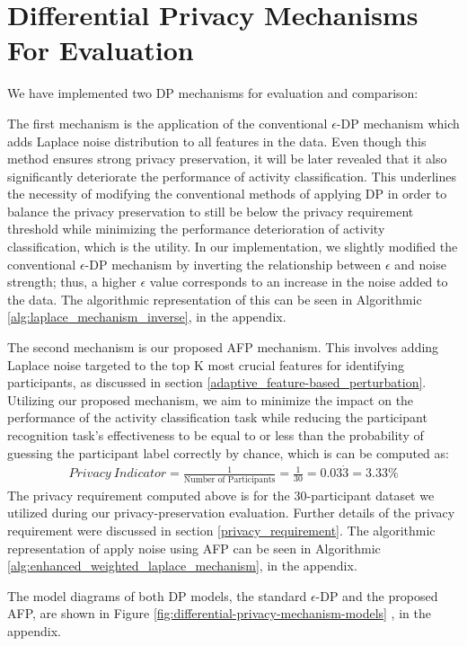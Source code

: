 \documentclass{l4proj}
\begin{document}
\section{Differential Privacy Mechanisms For Evaluation}
We have implemented two DP mechanisms for evaluation and comparison:

The first mechanism is the application of the conventional $\epsilon$-DP mechanism which adds Laplace noise distribution to all features in the data. Even though this method ensures strong privacy preservation, it will be later revealed that it also significantly deteriorate the performance of activity classification. This underlines the necessity of modifying the conventional methods of applying DP in order to balance the privacy preservation to still be below the privacy requirement threshold while minimizing the performance deterioration of activity classification, which is the utility. In our implementation, we slightly modified the conventional $\epsilon$-DP mechanism by inverting the relationship between $\epsilon$ and noise strength; thus, a higher $\epsilon$ value corresponds to an increase in the noise added to the data. The algorithmic representation of this can be seen in Algorithmic \ref{alg:laplace_mechanism_inverse}, in the appendix. 

The second mechanism is our proposed AFP mechanism. This involves adding Laplace noise targeted to the top K most crucial features for identifying participants, as discussed in section \ref{adaptive_feature-based_perturbation}. Utilizing our proposed mechanism, we aim to minimize the impact on the performance of the activity classification task while reducing the participant recognition task's effectiveness to be equal to or less than the probability of guessing the participant label correctly by chance, which is can be computed as: 
\begin{align*}
    Privacy\: Indicator = \frac{1}{\text{Number of Participants}} = \frac{1}{30} = 0.03\dot{3} = 3.33\%
\end{align*}
The privacy requirement computed above is for the 30-participant dataset we utilized during our privacy-preservation evaluation. Further details of the privacy requirement were discussed in section \ref{privacy_requirement}. The algorithmic representation of apply noise using AFP can be seen in Algorithmic \ref{alg:enhanced_weighted_laplace_mechanism}, in the appendix. 

The model diagrams of both DP models, the standard $\epsilon$-DP and the proposed AFP, are shown in Figure \ref{fig:differential-privacy-mechanism-models} , in the appendix.
\end{document}

